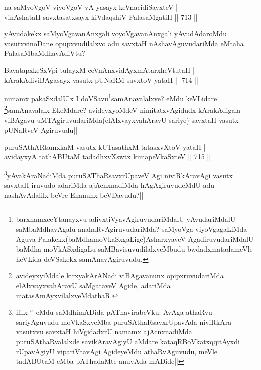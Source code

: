 \begin{shl}
na saMyoVgoV viyoVgoV vA yasayx keVnacidiSayxteV | \\
vinAshataH savxtasatxsayx kiVdaqshiV PalasaMgatiH \hfill||  713 ||  
\end{shl}

\begin{artha}
yAvudakekx saMyoVgavanAnxgali voyoVgavanAnxgali yAvudAdaroMdu vasutxvinoDane opupxvudilalxvo adu savxtaH nAshavAguvudariMda eMtaha PalasaMbaMdhavAdiVtu?
\end{artha}


\begin{shl}
BavatapxkeSxV\s pi tulayxM ceVnAnxvidAyxmAtarxheVtutaH | \\
kArakAdiviBAgasayx vasutx pUNaRM savxtoV yataH \hfill||  714 ||  
\end{shl}

\begin{artha}
nimamx pakaSxdalUlx I doVSavu\footnote{barxhamxceYtanayxvu adivxtiVyavAgiruvudariMdalU yAvudariMdalU saMbaMdhavAgalu anahaRvAgiruvudariMda? saMyoVga viyoVgagaLiMda Aguva Palakekx(baMdhamoVkaSxgaLige)AsharxyaveV AgadiruvudariMdalU baMdha moVkASxdigaLu saMBavisuvudilalxveMbudu bwdadxmatadameVle heVLida deVSakekx samAnavAgiruvudu.}samAnavalalxve? eMdu keVLidare \footnote{avideyxyiMdale kirxyakArANadi viBAgavanunx opipxruvudariMda elAlxvayxvahAravU saMgataveV Agide, adariMda matasAmAyxvilalxveMdathaR.}samAnavalalx EkeMdare? avideyxyoMdeV nimitatxvAgidudx kArakAdigala viBAgavu uMTAgiruvudariMda(elAlxvayxvahAravU sariye) savxtaH vasutx pUNaRveV Agiruvudu||
\end{artha}


\begin{shl}
puruSAthARtamxkaM vasutx kUTasathxM tatasxvXtoV yataH | \\
avidayxyA tathABUtaM tadadhxvXswtx kimapeVkaSxteV \hfill||  715 ||  
\end{shl}

\begin{artha}
\footnote{ililx `\stext' eMdu saMdhimADida pAThavirabeVku. AvAga athaRvu sariyAguvudu moVkaSxveMba puruSAthaRsavxrUpavAda niviRkAra vasutxvu savxtaH hiVgidadxrU namamx ajAcnxnadiMda puruSAthaRvalalxde savikAravAgiyU aMdare kataqRBoVkatxqqitAyxdi rUpavAgiyU vipariVtavAgi AgideyeMdu athaRvAguvudu, meVle tadABUtaM eMba pAThadaMte anuvAda mADide||}yAvakAraNadiMda puruSAThaRsavxrUpaveV Agi niviRkAravAgi vasutx savxtaH iruvudo adariMda ajAcnxnadiMda hAgAgiruvudeMdU adu nashAvAdalilx beVre Enanunx beVDavudu?||
\end{artha}


